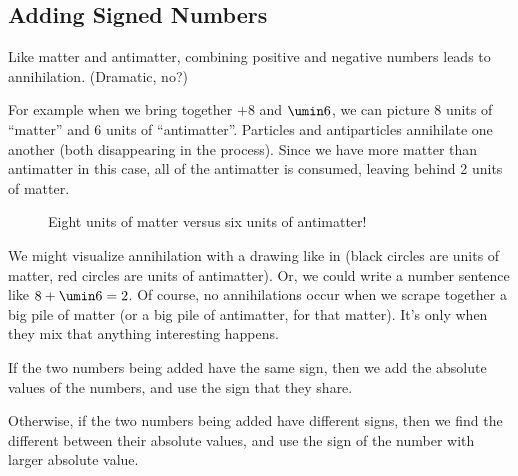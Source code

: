 \subsection{Adding Signed Numbers}

Like matter and antimatter, combining positive and negative numbers leads to annihilation. (Dramatic, no?)

For example when we bring together $+8$ and $\umin6$, we can picture 8 units of ``matter'' and 6 units of ``antimatter''. Particles and antiparticles annihilate one another (both disappearing in the process). Since we have more matter than antimatter in this case, all of the antimatter is consumed, leaving behind 2 units of matter.

\begin{figure}[!htbp]
\centering
{}
\caption{Eight units of matter versus six units of antimatter!}
\label{fig:intadd}
\end{figure}

We might visualize annihilation with a drawing like in  (black circles are units of matter, red circles are units of antimatter). Or, we could write a number sentence like $8 + \umin6 = 2$. Of course, no annihilations occur when we scrape together a big pile of matter (or a big pile of antimatter, for that matter). It's only when they mix that anything interesting happens.

\begin{boxeddef}
If the two numbers being added have the same sign, then we add the absolute values of the numbers, and use the sign that they share.

Otherwise, if the two numbers being added have different signs, then we find the different between their absolute values, and use the sign of the number with larger absolute value.
\end{boxeddef}

